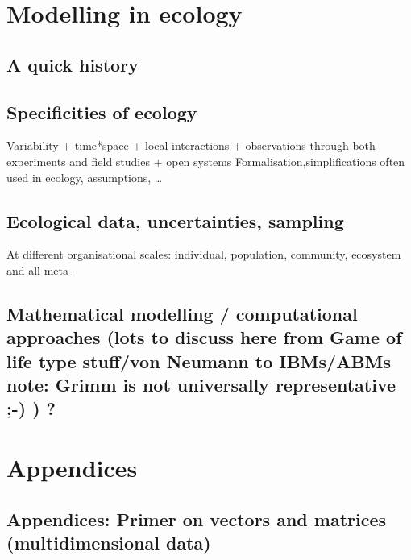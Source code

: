 \documentclass[
]{book}
\theoremstyle{definition}
\theoremstyle{definition}
\theoremstyle{definition}
\theoremstyle{definition}
\theoremstyle{remark}
\begin{document}
\section{Modelling in ecology}\label{modelling-in-ecology}

\subsection{A quick history}\label{a-quick-history}

\subsection{Specificities of ecology}\label{specificities-of-ecology}

Variability + time*space + local interactions + observations through both experiments and field studies + open systems
Formalisation,simplifications often used in ecology, assumptions, \ldots{}

\subsection{Ecological data, uncertainties, sampling}\label{ecological-data-uncertainties-sampling}

At different organisational scales: individual, population, community, ecosystem and all meta-

\subsection{Mathematical modelling / computational approaches (lots to discuss here from Game of life type stuff/von Neumann to IBMs/ABMs note: Grimm is not universally representative ;-) ) ?}\label{mathematical-modelling-computational-approaches-lots-to-discuss-here-from-game-of-life-type-stuffvon-neumann-to-ibmsabms-note-grimm-is-not-universally-representative--}

\section{Appendices}\label{appendices}

\subsection{Appendices: Primer on vectors and matrices (multidimensional data)}\label{appendices-primer-on-vectors-and-matrices-multidimensional-data}
\end{document}
